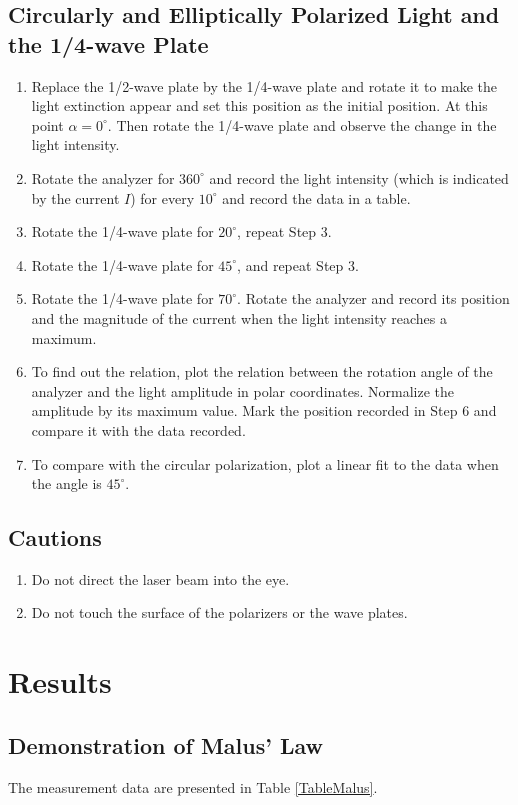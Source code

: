 \documentclass{article}
\begin{document}
\subsection{Circularly and Elliptically Polarized Light and the 1/4-wave Plate}
\begin{enumerate}
\item Replace the 1/2-wave plate by the 1/4-wave plate and rotate it to make the light extinction appear and set this position as the initial position. At this point $\alpha = 0^\circ$. Then rotate the 1/4-wave plate and observe the change in the light intensity.
\item Rotate the analyzer for $360^\circ$ and record the light intensity (which is indicated by the current $I$) for every $10^\circ$ and record the data in a table.
\item Rotate the 1/4-wave plate for $20^\circ$, repeat Step 3.
\item Rotate the 1/4-wave plate for $45^\circ$, and repeat Step 3.
\item Rotate the 1/4-wave plate for $70^\circ$. Rotate the analyzer and record its position and the magnitude of the current when the light intensity reaches a maximum.
\item To find out the relation, plot the relation between the rotation angle of the analyzer and the light amplitude in polar coordinates. Normalize the amplitude by its maximum value. Mark the position recorded in Step 6 and compare it with the data recorded. 
\item To compare with the circular polarization, plot a linear fit to the data when the angle is $45^\circ$.
\end{enumerate}


\subsection*{Cautions}
\begin{enumerate}
\item Do not direct the laser beam into the eye.
\item Do not touch the surface of the polarizers or the wave plates. 
\end{enumerate}



\section{Results}

\subsection{Demonstration of Malus' Law}
The measurement data are presented in Table \ref{TableMalus}.
\end{document}
